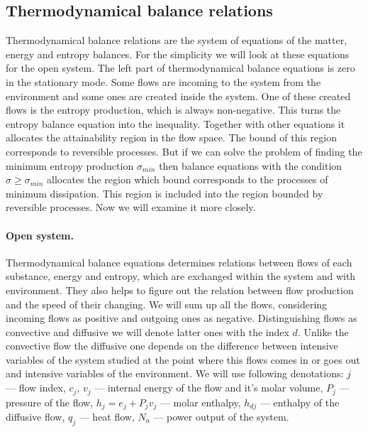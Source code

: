 \documentclass[epjST]{svjour}
\begin{document}
\subsection{Thermodynamical balance relations}

Thermodynamical balance relations are the system of equations of the matter, energy and entropy balances. For the simplicity we will look at these equations for the open system. The left part of thermodynamical balance equations is zero in the stationary mode. Some flows are incoming to the system from the environment and some ones are created inside the system. One of these created flows is the entropy production, which is always non-negative. This turns the entropy balance equation into the inequality. Together with other equations it allocates the attainability region in the flow space. The bound of this region corresponds to reversible processes. But if we can solve the problem of finding the minimum entropy production $\sigma_{min}$ then balance equations with the condition $\sigma \geq \sigma_{min}$ allocates the region which bound corresponds to the processes of minimum dissipation. This region is included into the region bounded by reversible processes. Now we will examine it more closely.

\paragraph{Open system.} Thermodynamical balance equations determines relations between flows of each substance, energy and entropy, which are exchanged within the system and with environment. They also helps to figure out the relation between flow production and the speed of their changing. We will sum up all the flows, considering incoming flows as positive and outgoing ones as negative. Distinguishing flows as convective and diffusive we will denote latter ones with the index $d$. Unlike the convective flow the diffusive one depends on the difference between intensive variables of the system studied at the point where this flows comes in or goes out and intensive variables of the environment. We will use following denotations: $j$ --- flow index, $c_j$, $v_j$ --- internal energy of the flow and it's molar volume, $P_j$ --- pressure of the flow, $h_j = e_j + P_j v_j$ --- molar enthalpy, $h_{dj}$ --- enthalpy of the diffusive flow, $q_j$ --- heat flow, $N_a$ --- power output of the system.
\end{document}
